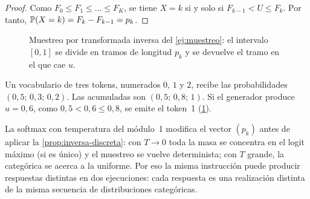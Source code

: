 \begin{proof}
Como $F_0\le F_1\le\dots\le F_K$, se tiene $X=k$ si y solo si $F_{k-1}<U\le F_k$. Por tanto, $\mathbb{P}(X=k)=F_k-F_{k-1}=p_k$.
\end{proof}

\begin{figure}[h]
\centering
{}
\caption{Muestreo por transformada inversa del \cref{ej:muestreo}: el intervalo $[0,1]$ se divide en tramos de longitud $p_k$ y se devuelve el tramo en el que cae $u$.}
\label{fig:inversa}
\end{figure}

\begin{ejemplo}\label{ej:muestreo}
Un vocabulario de tres tokens, numerados $0$, $1$ y $2$, recibe las probabilidades $(0{,}5;\,0{,}3;\,0{,}2)$. Las acumuladas son $(0{,}5;\,0{,}8;\,1)$. Si el generador produce $u=0{,}6$, como $0{,}5<0{,}6\le 0{,}8$, se emite el token~1 (\cref{fig:inversa}).
\end{ejemplo}

\begin{observacion}
La softmax con temperatura del módulo~1 modifica el vector $(p_k)$ antes de aplicar la \cref{prop:inversa-discreta}: con $T\to 0$ toda la masa se concentra en el logit máximo (si es único) y el muestreo se vuelve determinista; con $T$ grande, la categórica se acerca a la uniforme. Por eso la misma instrucción puede producir respuestas distintas en dos ejecuciones: cada respuesta es una realización distinta de la misma secuencia de distribuciones categóricas.
\end{observacion}


